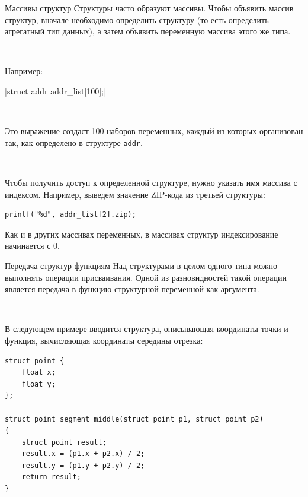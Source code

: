 \documentclass{beamer}
\begin{document}
\begin{frame}[fragile]{Массивы структур}
    Структуры часто образуют массивы. Чтобы объявить массив структур,
    вначале необходимо определить структуру (то есть определить агрегатный тип данных), а затем объявить переменную массива этого же типа. 
    
    ~
    
    Например:
    
    |struct addr addr_list[100];|
    
    ~
    
    Это выражение создаст 100 наборов переменных, каждый из которых
    организован так, как определено в структуре \texttt{addr}.
    
    ~
    
    Чтобы получить доступ к определенной структуре, нужно указать имя
    массива с индексом. Например, выведем значение ZIP-кода из третьей структуры:
    
\begin{verbatim}
printf("%d", addr_list[2].zip);
\end{verbatim}
    
    Как и в других массивах переменных, в массивах структур индексирование начинается с 0.
\end{frame}

\begin{frame}[fragile]{Передача структур функциям}
    Над структурами в целом одного типа можно выполнять операции
    присваивания. Одной из разновидностей такой операции является передача в функцию структурной переменной как аргумента.
    
    ~
    
    В следующем примере вводится структура, описывающая координаты точки и функция, вычисляющая координаты середины отрезка:
\begin{verbatim}
struct point {
    float x;
    float y;
};

struct point segment_middle(struct point p1, struct point p2)
{
    struct point result;
    result.x = (p1.x + p2.x) / 2;
    result.y = (p1.y + p2.y) / 2;
    return result;
}
\end{verbatim}
\end{frame}
\end{document}
